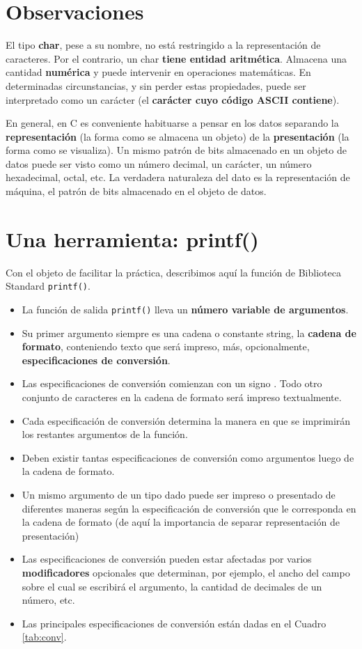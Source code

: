 \section{Observaciones}

El tipo \textbf{char}, pese a su nombre, no está restringido a la representación de caracteres. Por el contrario,
un char \textbf{tiene entidad aritmética}. Almacena una cantidad \textbf{numérica} y puede intervenir en
operaciones matemáticas. En determinadas circunstancias, y sin perder estas propiedades, puede
ser interpretado como un carácter (el \textbf{carácter cuyo código ASCII contiene}).

En general, en C es conveniente habituarse a pensar en los datos separando la \textbf{representación} (la
forma como se almacena un objeto) de la \textbf{presentación} (la forma como se visualiza). Un mismo
patrón de bits almacenado en un objeto de datos puede ser visto como un número decimal, un
carácter, un número hexadecimal, octal, etc. La verdadera naturaleza del dato es la representación
de máquina, el patrón de bits almacenado en el objeto de datos.


\section{Una herramienta: printf()}
\label{sec:lafuncionprintf}
Con el objeto de facilitar la práctica, describimos aquí la función de Biblioteca Standard \lstinline{printf()}.

\begin{itemize}
	\item La función de salida \lstinline{printf()} lleva un \textbf{número variable de argumentos}.
	\item Su primer argumento siempre es una cadena o constante string, la \textbf{cadena de formato},
conteniendo texto que será impreso, más, opcionalmente, \textbf{especificaciones de conversión}.
	\item Las especificaciones de conversión comienzan con un signo \quotes{\lstinline$\%$}. Todo otro conjunto de
caracteres en la cadena de formato será impreso textualmente.
	\item Cada especificación de conversión determina la manera en que se imprimirán los restantes
argumentos de la función.
	\item Deben existir tantas especificaciones de conversión como argumentos luego de la cadena de
formato.
	\item Un mismo argumento de un tipo dado puede ser impreso o presentado de diferentes maneras
según la especificación de conversión que le corresponda en la cadena de formato (de aquí la
importancia de separar representación de presentación)
	\item Las especificaciones de conversión pueden estar afectadas por varios \textbf{modificadores} opcionales
que determinan, por ejemplo, el ancho del campo sobre el cual se escribirá el argumento, la
cantidad de decimales de un número, etc.
	\item Las principales especificaciones de conversión están dadas en el Cuadro \ref{tab:conv}.
\end{itemize}

